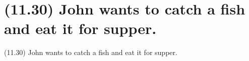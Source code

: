 \documentclass{article}
\begin{document}
\bigbreak

\clearpage

%
%

\section*{(11.30) John wants to catch a fish and eat it for supper.}

\bigbreak
\begin{enumerate*}
\item[(11.30)] John wants to catch a fish and eat it for supper.
\end{enumerate*}
\bigbreak
\end{document}
